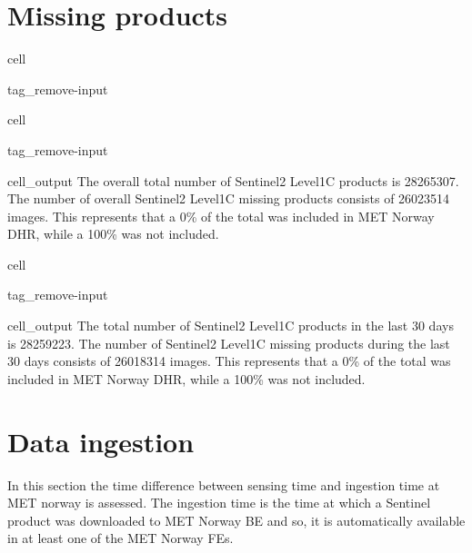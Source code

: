 \documentclass[letterpaper,10pt,english]{jupyterBook}
\begin{document}
\section{Missing products}
\label{\detokenize{S2L1C_portals:missing-products}}
\begin{sphinxuseclass}{cell}
\begin{sphinxuseclass}{tag_remove-input}
\end{sphinxuseclass}
\end{sphinxuseclass}
\begin{sphinxuseclass}{cell}
\begin{sphinxuseclass}{tag_remove-input}\begin{sphinxVerbatimOutput}

\begin{sphinxuseclass}{cell_output}
\sphinxAtStartPar
The overall total number of Sentinel\sphinxhyphen{}2 Level\sphinxhyphen{}1C products is 28265307. The number of overall Sentinel\sphinxhyphen{}2 Level\sphinxhyphen{}1C missing products consists of 26023514 images. This represents that a 0\% of the total was included in MET Norway DHR, while a 100\% was not included.

\end{sphinxuseclass}\end{sphinxVerbatimOutput}

\end{sphinxuseclass}
\end{sphinxuseclass}
\begin{sphinxuseclass}{cell}
\begin{sphinxuseclass}{tag_remove-input}\begin{sphinxVerbatimOutput}

\begin{sphinxuseclass}{cell_output}
\sphinxAtStartPar
The total number of Sentinel\sphinxhyphen{}2 Level\sphinxhyphen{}1C products in the last 30 days is 28259223. The number of Sentinel\sphinxhyphen{}2 Level\sphinxhyphen{}1C missing products during the last 30 days consists of 26018314 images. This represents that a 0\% of the total was included in MET Norway DHR, while a 100\% was not included.

\end{sphinxuseclass}\end{sphinxVerbatimOutput}

\end{sphinxuseclass}
\end{sphinxuseclass}

\section{Data ingestion}
\label{\detokenize{S2L1C_portals:data-ingestion}}
\sphinxAtStartPar
In this section the time difference between sensing time and ingestion time at MET norway is assessed. The ingestion time is the time at which a Sentinel product was downloaded to MET Norway BE and so, it is automatically available in at least one of the MET Norway FEs.
\end{document}
